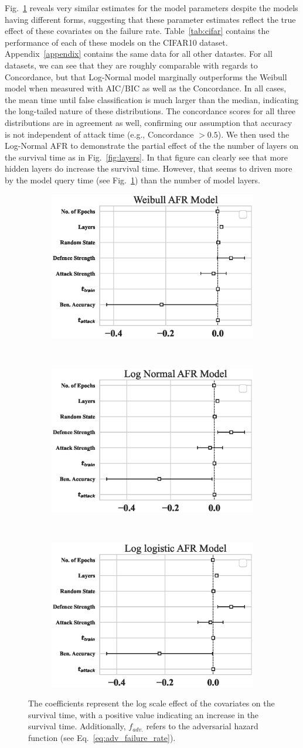 Fig.~\ref{fig:afr_models} reveals very similar estimates for the model parameters despite the models having different forms, suggesting that these parameter estimates reflect the true effect of these covariates on the failure rate. Table~\ref{tab:cifar} contains the performance of each of these models on the CIFAR10 dataset.  Appendix~\ref{appendix} contains the same data for all other datastes. For all datasets, we can see that they are roughly comparable with regards to Concordance, but that Log-Normal model marginally outperforms the Weibull model when measured with AIC/BIC as well as the Concordance.
In all cases, the mean time until false classification is much larger than the median, indicating the long-tailed nature of these distributions.
The concordance scores for all three distributions are in agreement as well, confirming our assumption that accuracy is not independent of attack time (e.g., Concordance $> 0.5$).
We then used the Log-Normal AFR to demonstrate the partial effect of the the number of layers on the survival time as in Fig.~\ref{fig:layers}. In that figure can clearly see that more hidden layers do increase the survival time. However, that seems to driven more by the model query time (see Fig.~\ref{fig:afr_models}) than the number of model layers.
\begin{figure}
	\begin{subfigure}
		\centering
		\includegraphics[width=.32\textwidth]{cifar100/weibull_aft.eps}
	\end{subfigure}%
	~
	\begin{subfigure}
		\centering
		\includegraphics[width=.32\textwidth]{cifar100/log_normal_aft.eps}
	\end{subfigure}
	~
	\begin{subfigure}
		\centering
		\includegraphics[width=.32\textwidth]{cifar100/log_logistic_aft.eps}
	\end{subfigure}
	\caption{The coefficients represent the log scale effect of the covariates on the survival time, with a positive value indicating an increase in the survival time. Additionally, $f_{adv.}$ refers to the adversarial hazard function (see Eq.~\ref{eq:adv_failure_rate}).}
	\label{fig:afr_models}
\end{figure}

